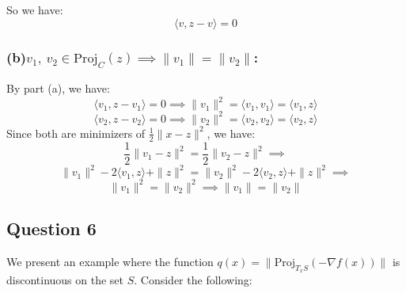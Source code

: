 \documentclass[12p]{article}
\newcommand*{\proj}{\text{Proj}}
\begin{document}
So we have:
\[
    \langle v, z-v\rangle = 0  
\]
\subsubsection*{(b)\quad \(v_1,\ v_2\in \proj_C(z)\implies \|v_1\|=\|v_2\|\):}\hfil\par
By part (a), we have:
\[
    \langle v_1, z-v_1\rangle = 0 \implies \|v_1\|^2=\langle v_1, v_1\rangle=\langle v_1, z\rangle
\]
\[
    \langle v_2, z-v_2\rangle = 0 \implies \|v_2\|^2=\langle v_2, v_2\rangle=\langle v_2, z\rangle
\]
Since both are minimizers of \(\frac{1}{2}\|x-z\|^2\), we have:
\[
    \frac{1}{2}\|v_1-z\|^2= \frac{1}{2}\|v_2-z\|^2  \implies
\]
\[
  \|v_1\|^2-2\langle v_1, z\rangle+\|z\|^2=\|v_2\|^2-2\langle v_2, z\rangle+\|z\|^2\implies  
\]
\[
  \|v_1\|^2=\|v_2\|^2\implies \|v_1\|=\|v_2\|
\]
\subsection*{Question 6} 

We present an example where the function \( q(x) = \lVert \text{Proj}_{T_xS}(-\nabla f(x)) \rVert \) is discontinuous on the set \( S \). Consider the following:
\end{document}
